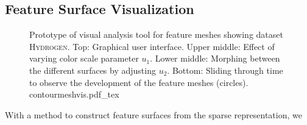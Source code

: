 \subsection{Feature Surface Visualization}
%
\begin{figure}[p]
    \begin{captionbeside}{
    Prototype of visual analysis tool for feature meshes showing dataset
	\textsc{Hydrogen}.
	Top: Graphical user interface.
	Upper middle: Effect of varying color scale parameter $u_1$.
	Lower middle: Morphing between the different surfaces by adjusting $u_2$.
	Bottom: Sliding through time to observe the development of the feature
	meshes (circles).
	}
 	\def\svgwidth{0.6\linewidth}
		{contourmeshvis.pdf_tex}
    \end{captionbeside}
	\label{fig_contourmeshvis}
\end{figure}
%
With a method to construct feature surfaces from the sparse representation, we
